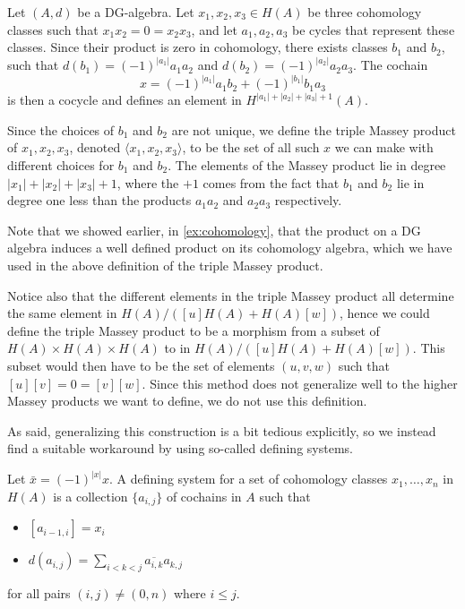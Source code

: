 \begin{definition}
Let $(A,d)$ be a DG-algebra. Let $x_1, x_2, x_3 \in H(A)$ be three cohomology classes such that $x_1 x_2 = 0 = x_2 x_3$, and let $a_1, a_2, a_3$ be cycles that represent these classes. Since their product is zero in cohomology, there exists classes $b_1$ and $b_2$, such that $d(b_1)=(-1)^{|a_1|}a_1a_2$ and $d(b_2)=(-1)^{|a_2|}a_2a_3$. The cochain 
\begin{equation*}
    x = (-1)^{|a_1|}a_1 b_2 + (-1)^{|b_1|}b_1 a_3
\end{equation*}
is then a cocycle and defines an element in $H^{|a_1|+|a_2|+|a_3|+1}(A)$.  

Since the choices of $b_1$ and $b_2$ are not unique, we define the triple Massey product of $x_1, x_2, x_3$, denoted $\langle x_1, x_2, x_3 \rangle$, to be the set of all such $x$ we can make with different choices for $b_1$ and $b_2$. The elements of the Massey product lie in degree $|x_1|+|x_2|+|x_3|+1$, where the $+1$ comes from the fact that $b_1$ and $b_2$ lie in degree one less than the products $a_1 a_2$ and $a_2 a_3$ respectively. 
\end{definition} 

\begin{remark}
Note that we showed earlier, in \cref{ex:cohomology}, that the product on a DG algebra induces a well defined product on its cohomology algebra, which we have used in the above definition of the triple Massey product.  
\end{remark}

Notice also that the different elements in the triple Massey product all determine the same element in $H(A)/([u]H(A)+H(A)[w])$, hence we could define the triple Massey product to be a morphism from a subset of $H(A)\times H(A)\times H(A)$ to in $H(A)/([u]H(A)+H(A)[w])$. This subset would then have to be the set of elements $(u, v, w)$ such that $[u][v] = 0 = [v][w]$. Since this method does not generalize well to the higher Massey products we want to define, we do not use this definition. 

As said, generalizing this construction is a bit tedious explicitly, so we instead find a suitable workaround by using so-called defining systems. 

\begin{definition}
Let $\bar{x} = (-1)^{|x|}x$. A defining system for a set of cohomology classes $x_1, \ldots, x_n$ in $ H(A)$ is a collection $\{ a_{i,j}\}$ of cochains in $A$ such that
\begin{itemize}
    \item $[a_{i-1, i}] = x_i$
    \item $d(a_{i, j}) = \displaystyle\sum_{i<k<j}\overline{a_{i, k}}a_{k, j}$
\end{itemize}
for all pairs $(i,j)\neq (0,n)$ where $i\leq j$.
\end{definition}

